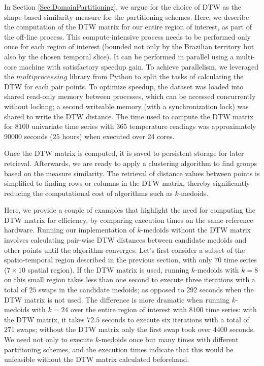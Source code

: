 In Section \ref{Sec:DomainPartitioning}, we argue for the choice of DTW as the shape-based similarity measure for the partitioning schemes. Here, we describe the computation of the DTW matrix for our entire region of interest, as part of the off-line process. This compute-intensive process needs to be performed only once for each region of interest (bounded not only by the Brazilian territory but also by the chosen temporal slice). It can be performed in parallel using a multi-core machine with satisfactory speedup gain. To achieve parallelism, we leveraged the $multiprocessing$ library from Python to split the tasks of calculating the DTW for each pair points. To optimize speedup, the dataset was loaded into shared read-only memory between processes, which can be accessed concurrently without locking; a second writeable memory (with a synchronization lock) was shared to write the DTW distance. The time used to compute the DTW matrix for $8100$ univariate time series with $365$ temperature readings was approximately $90000$ seconds ($25$ hours) when executed over 24 cores.

Once the DTW matrix is computed, it is saved to persistent storage for later retrieval. Afterwards, we are ready to apply a clustering algorithm to find groups based on the measure similarity. The retrieval of distance values between points is simplified to finding rows or columns in the DTW matrix, thereby significantly reducing the computational cost of algorithms such as $k$-medoids.

Here, we provide a couple of examples that highlight the need for computing the DTW matrix for efficiency, by comparing execution times on the same reference hardware. Running our implementation of $k$-medoids without the DTW matrix involves calculating pair-wise DTW distances between candidate medoids and other points until the algorithm converges. Let's first consider a subset of the spatio-temporal region described in the previous section, with only $70$ time series ($7 \times 10$ spatial region). If the DTW matrix is used, running $k$-medoids with $k=8$ on this small region takes less than one second to execute three iterations with a total of $25$ swaps in the candidate medoids; as opposed to $292$ seconds when the DTW matrix is not used. The difference is more dramatic when running $k$-medoids with $k=24$ over the entire region of interest with $8100$ time series: with the DTW matrix, it  takes $72.5$ seconds to execute six iterations with a total of $271$ swaps; without the DTW matrix only the first swap took over $4400$ seconds. We need not only to execute $k$-medoids once but many times with different partitioning schemes, and the execution times indicate that this would be unfeasible without the DTW matrix calculated beforehand.

